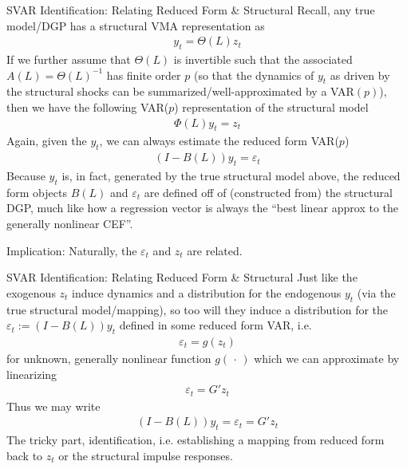 \documentclass[aspectratio=169, handout]{beamer}
\begin{document}
{\footnotesize
\begin{frame}{SVAR Identification: Relating Reduced Form \& Structural}
Recall, any true model/DGP has a \alert{structural VMA} representation as
\begin{align*}
  y_t=\Theta(L)z_t
\end{align*}
If we further assume that $\Theta(L)$ is invertible such that the
associated $A(L)=\Theta(L)^{-1}$ has finite order $p$ (so that the
dynamics of $y_t$ as driven by the structural shocks can be
summarized/well-approximated by a VAR$(p)$), then we have
the following VAR($p$) representation of the structural model
\begin{align*}
  \Phi(L)y_t=z_t
\end{align*}
Again, given the $y_t$, we can always estimate the \alert{reduced form}
VAR($p$)
\begin{align*}
  (I-B(L))y_t = \varepsilon_t
\end{align*}
Because $y_t$ is, in fact, generated by the true structural model above,
the reduced form objects $B(L)$ and $\varepsilon_t$ are \alert{defined
off of} (constructed from) the structural DGP,
much like how a regression vector is always the ``best linear approx to
the generally nonlinear CEF''.

\alert{Implication}: Naturally, the $\varepsilon_t$ and $z_t$ are related.
\end{frame}
}

{\footnotesize
\begin{frame}{SVAR Identification: Relating Reduced Form \& Structural}
Just like the exogenous $z_t$ induce dynamics and a distribution for the
endogenous $y_t$ (via the true structural model/mapping), so too will
they induce a distribution for the $\varepsilon_t:=(I-B(L))y_t$ defined
in some reduced form VAR, i.e.
\begin{align*}
  \varepsilon_t = g(z_t)
\end{align*}
for unknown, generally nonlinear function $g(\,\cdot\,)$ which we
can approximate by linearizing
\begin{align*}
  \varepsilon_t = G'z_t
\end{align*}
Thus we may write
\begin{align*}
  (I-B(L))y_t = \varepsilon_t = G'z_t
\end{align*}
The tricky part, \alert{identification}, i.e. establishing a mapping
from reduced form back to $z_t$ or the structural impulse responses.
\end{frame}
}
\end{document}
